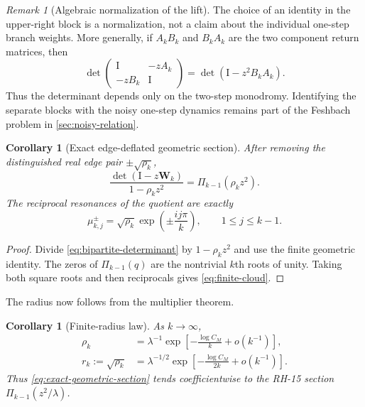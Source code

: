 \documentclass[11pt]{article}
\newtheorem{corollary}[theorem]{Corollary}
\theoremstyle{definition}
\theoremstyle{remark}
\newtheorem{remark}[theorem]{Remark}
\newcommand{\Id}{\mathrm I}
\newcommand{\bW}{\mathbf W}
\begin{document}
\begin{remark}[Algebraic normalization of the lift]
\label{rem:bipartite-normalization}
The choice of an identity in the upper-right block is a normalization, not a
claim about the individual one-step branch weights.  More generally, if
$A_kB_k$ and $B_kA_k$ are the two component return matrices, then
\[
 \det\!\begin{pmatrix}\Id&-zA_k\\-zB_k&\Id\end{pmatrix}
 =\det(\Id-z^2B_kA_k).
\]
Thus the determinant depends only on the two-step monodromy.  Identifying
the separate blocks with the noisy one-step dynamics remains part of the
Feshbach problem in \cref{sec:noisy-relation}.
\end{remark}

\begin{corollary}[Exact edge-deflated geometric section]
\label{cor:geometric-section}
After removing the distinguished real edge pair $\pm\sqrt{\rho_k}$,
\begin{equation}\label{eq:exact-geometric-section}
 \boxed{
 \frac{\det(\Id-z\bW_k)}{1-\rho_kz^2}
 =\Pi_{k-1}(\rho_kz^2).}
\end{equation}
The reciprocal resonances of the quotient are exactly
\begin{equation}\label{eq:finite-cloud}
 \mu_{k,j}^{\pm}
 =\sqrt{\rho_k}\exp\!\left(\pm\frac{ij\pi}{k}\right),
 \qquad 1\le j\le k-1.
\end{equation}
\end{corollary}

\begin{proof}
Divide \eqref{eq:bipartite-determinant} by $1-\rho_kz^2$ and use the finite
geometric identity.  The zeros of $\Pi_{k-1}(q)$ are the nontrivial $k$th
roots of unity.  Taking both square roots and then reciprocals gives
\eqref{eq:finite-cloud}.
\end{proof}

The radius now follows from the multiplier theorem.

\begin{corollary}[Finite-radius law]
\label{cor:radius-law}
As $k\to\infty$,
\begin{align}
 \rho_k
 &=\lambda^{-1}
 \exp\!\left[-\frac{\log C_M}{k}+o(k^{-1})\right],
 \label{eq:rho-law}\\
 r_k:=\sqrt{\rho_k}
 &=\lambda^{-1/2}
 \exp\!\left[-\frac{\log C_M}{2k}+o(k^{-1})\right].
 \label{eq:radius-law}
\end{align}
Thus \eqref{eq:exact-geometric-section} tends coefficientwise to the RH-15
section $\Pi_{k-1}(z^2/\lambda)$.
\end{corollary}
\end{document}
